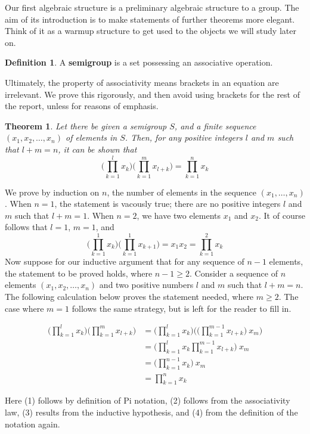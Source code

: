 \documentclass[12pt]{amsbook}
\makeatletter
\theoremstyle{plain}
\newtheorem{theorem}{Theorem}[chapter]
\theoremstyle{definition}
\newtheorem{definition}{Definition}
\renewenvironment{proof}[1][\proofname]{\par
  \pushQED{\qed}%
  \normalfont \topsep6\p@\@plus6\p@\relax
  \list{}{\leftmargin=0em
          \rightmargin=\leftmargin
          \settowidth{\itemindent}{\itshape#1}%
          \labelwidth=\itemindent}

  \item[\hskip\labelsep
        \itshape
    #1\@addpunct{.}]\ignorespaces
}{%
  \popQED\endlist\@endpefalse
}
\makeatother
\begin{document}
Our first algebraic structure is a preliminary algebraic structure to a group. The aim of its introduction is to make statements of further theorems more elegant. Think of it as a warmup structure to get used to the objects we will study later on.

\begin{definition}
    A {\bf semigroup} is a set possessing an associative operation.
\end{definition}

Ultimately, the property of associativity means brackets in an equation are irrelevant. We prove this rigorously, and then avoid using brackets for the rest of the report, unless for reasons of emphasis.

\begin{theorem}
Let there be given a semigroup $S$, and a finite sequence $(x_1, x_2, \dots, x_n)$ of elements in $S$. Then, for any positive integers $l$ and $m$ such that $l + m = n$, it can be shown that
%
\[ \big( \prod_{k=1}^l x_k \big) \big( \prod_{k=1}^m x_{l + k} \big) = \prod_{k=1}^n x_k \]
\end{theorem}
\begin{proof}
    We prove by induction on $n$, the number of elements in the sequence $(x_1, \dots, x_n)$. When $n = 1$, the statement is vacously true; there are no positive integers $l$ and $m$ such that $l + m = 1$. When $n = 2$, we have two elements $x_1$ and $x_2$. It of course follows that $l = 1$, $m = 1$, and
    \[ \big( \prod_{k=1}^1 x_k \big) \big( \prod_{k=1}^1 x_{k+1} \big) = x_1 x_2 = \prod_{k=1}^2 x_k \]
    Now suppose for our inductive argument that for any sequence of $n-1$ elements, the statement to be proved holds, where $n-1 \geq 2$. Consider a sequence of $n$ elements $(x_1, x_2, \dots, x_n)$ and two positive numbers $l$ and $m$ such that $l + m = n$. The following calculation below proves the statement needed, where $m \geq 2$. The case where $m = 1$ follows the same strategy, but is left for the reader to fill in.

    \begin{align}
        \big( \prod_{k=1}^l x_k \big) \big( \prod_{k=1}^m x_{l + k} \big) &= \big( \prod_{k=1}^l x_k \big) \big( \big( \prod_{k=1}^{m-1} x_{l + k} \big)\ x_m \big)\\
        &= \big( \prod_{k=1}^l x_k \prod_{k=1}^{m-1} x_{l + k} \big)\ x_m\\
        &= \big( \prod_{k=1}^{n-1} x_k \big)\ x_m\\
        &= \prod_{k=1}^n x_k
    \end{align}

    Here (1) follows by definition of Pi notation, (2) follows from the associativity law, (3) results from the inductive hypothesis, and (4) from the definition of the notation again.
\end{proof}
\end{document}
